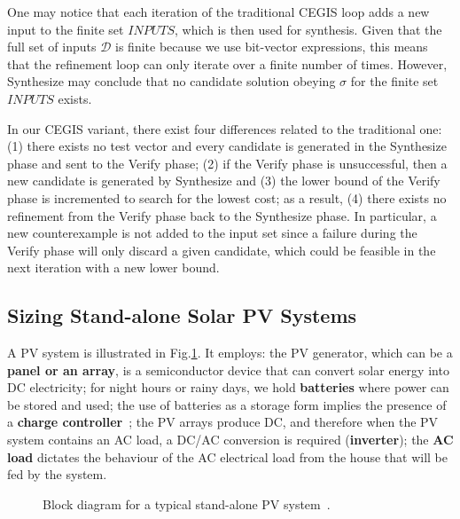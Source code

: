 \documentclass[runningheads]{llncs}
\begin{document}
One may notice that each iteration of the traditional CEGIS loop adds a new input to the finite set $INPUTS$, which is then used for synthesis. Given that the full set of inputs $\mathcal{D}$ is finite because we use bit-vector expressions, this means that the refinement loop can only iterate over a finite number of times. However, {\sc Synthesize} may conclude that no candidate solution obeying $\sigma$ for the finite set $INPUTS$ exists. 

In our CEGIS variant, there exist four differences related to the traditional one: 
(1) there exists no test vector and every candidate is generated in the {\sc Synthesize} phase and sent to the {\sc Verify} phase; 
(2) if the {\sc Verify} phase is unsuccessful, then a new candidate is generated by {\sc Synthesize} and 
(3) the lower bound of the {\sc Verify} phase is incremented to search for the lowest cost; as a result,
(4) there exists no refinement from the {\sc Verify} phase back to the {\sc Synthesize} phase. In particular, a new counterexample is not added to the {\sc input} set since a failure during the {\sc Verify} phase will only discard a given candidate, which could be feasible in the next iteration with a new lower bound.

\subsection{Sizing Stand-alone Solar PV Systems}
\label{sec:sizing}

A PV system is illustrated in Fig.\ref{fig:blockdiagram}. It 
employs: the PV generator, which can be a \textbf{panel or an array}, is a semiconductor device that can convert solar energy into DC electricity; for night hours or rainy days, we hold \textbf{batteries} where power can be stored and used; the use of batteries as a storage form implies the presence of a \textbf{charge controller}~\cite{Hansen}; the PV arrays produce DC, and therefore when the PV system contains an AC load, a DC/AC conversion is required (\textbf{inverter}); the \textbf{AC load} dictates the behaviour of the AC electrical load from the house that will be fed by the system.

\begin{figure}[h]
\centering
\caption{Block diagram for a typical stand-alone PV system~\cite{Hansen}.}
\label{fig:blockdiagram} 
\end{figure}
\end{document}

